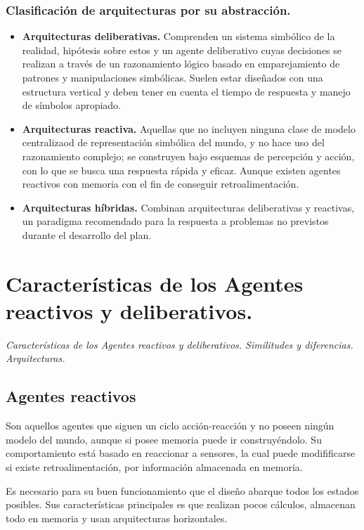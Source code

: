 \documentclass[a4paper]{article}
\begin{document}
\subsubsection*{Clasificación de arquitecturas por su abstracción.}
\begin{itemize}
  \item \textbf{Arquitecturas deliberativas.} Comprenden un sistema simbólico de la realidad, hipótesis sobre estos y un agente deliberativo 
  cuyas decisiones se realizan a través de un razonamiento lógico basado en emparejamiento de patrones y manipulaciones simbólicas.
  Suelen estar diseñados con una estructura vertical y deben tener en cuenta el tiempo de respuesta y manejo de símbolos apropiado. 
  
  \item \textbf{Arquitecturas reactiva.} Aquellas que no incluyen ninguna clase de modelo centralizaod de representación
  simbólica del mundo, y no hace uso del razonamiento complejo; se construyen bajo esquemas de percepción y acción, con lo que se busca
  una respuesta rápida y eficaz. Aunque existen agentes reactivos con memoria con el fin de conseguir retroalimentación.  
  
  \item \textbf{Arquitecturas híbridas. } Combinan arquitecturas deliberativas y reactivas, un paradigma recomendado para la respuesta a problemas
  no previstos durante el desarrollo del plan. 
\end{itemize}


\newpage
\section{ Características de los Agentes reactivos y deliberativos.}
 \textit{Características de los Agentes reactivos y deliberativos. Similitudes y diferencias. Arquitecturas.}

\subsection{Agentes reactivos}
Son aquellos agentes que siguen un ciclo acción-reacción y no poseen ningún modelo del mundo, aunque si posee memoria puede ir
construyéndolo. Su comportamiento está basado en reaccionar a sensores, la cual puede modifificarse si existe retroalimentación, 
por información almacenada en memoria.

Es necesario para su buen funcionamiento que el diseño abarque todos los estados posibles. 
Sus características principales es que realizan pocos cálculos, almacenan todo en memoria y usan arquitecturas 
horizontales. 
\end{document}
